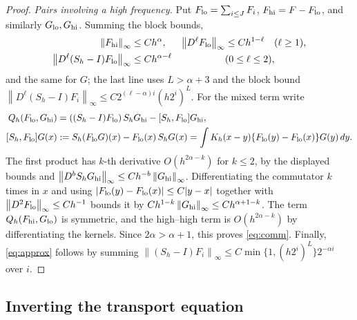 \documentclass[11pt]{article}
\numberwithin{equation}{section}
\newcommand{\norm}[1]{\left\|#1\right\|}
\begin{document}
\begin{proof}
\emph{Pairs involving a high frequency.} Put
$F_{\rm lo}=\sum_{i\le J}F_i$, $F_{\rm hi}=F-F_{\rm lo}$, and similarly
$G_{\rm lo},G_{\rm hi}$. Summing the block bounds,
\[
 \begin{aligned}
 \norm{F_{\rm hi}}_\infty&\le Ch^\alpha,&
 \norm{D^\ell F_{\rm lo}}_\infty&\le Ch^{1-\ell}\quad(\ell\ge1),\\
 \norm{D^\ell(S_h-I)F_{\rm lo}}_\infty&\le Ch^{\alpha-\ell}
                  &&(0\le\ell\le2),
 \end{aligned}
\]
and the same for $G$; the last line uses $L>\alpha+3$ and the block
bound $\norm{D^\ell(S_h-I)F_i}_\infty\le C2^{(\ell-\alpha)i}(h2^i)^L$.
For the mixed term write
\begin{align*}
 Q_h(F_{\rm lo},G_{\rm hi})
 &=((S_h-I)F_{\rm lo})\,S_hG_{\rm hi}-[S_h,F_{\rm lo}]G_{\rm hi},\\
 [S_h,F_{\rm lo}]G(x)&:=S_h(F_{\rm lo}G)(x)-F_{\rm lo}(x)\,S_hG(x)
 =\int K_h(x-y)\{F_{\rm lo}(y)-F_{\rm lo}(x)\}G(y)\,dy .
\end{align*}
The first product has $k$-th derivative $O(h^{2\alpha-k})$ for
$k\le2$, by the displayed bounds and
$\norm{D^bS_hG_{\rm hi}}_\infty\le Ch^{-b}\norm{G_{\rm hi}}_\infty$.
Differentiating the commutator $k$ times in $x$ and using
$|F_{\rm lo}(y)-F_{\rm lo}(x)|\le C|y-x|$ together with
$\norm{D^2F_{\rm lo}}_\infty\le Ch^{-1}$ bounds it by
$Ch^{1-k}\norm{G_{\rm hi}}_\infty\le Ch^{\alpha+1-k}$. The term
$Q_h(F_{\rm hi},G_{\rm lo})$ is symmetric, and the high--high term is
$O(h^{2\alpha-k})$ by differentiating the kernels. Since $2\alpha>\alpha+1$, this proves
\eqref{eq:comm}. Finally, \eqref{eq:approx} follows by summing
$\norm{(S_h-I)F_i}_\infty\le C\min\{1,(h2^i)^L\}2^{-\alpha i}$ over $i$.
\end{proof}

\subsection{Inverting the transport equation}\label{sec:transport}
\end{document}
